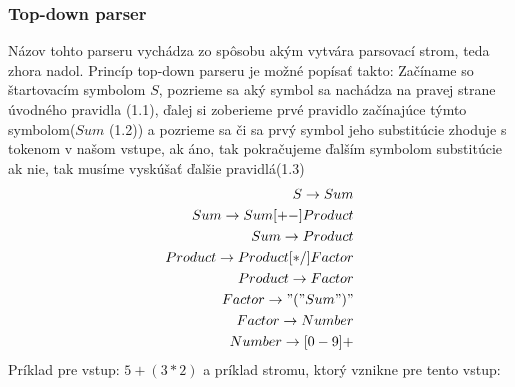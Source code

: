 \documentclass[12pt,a4paper]{report}
\theoremstyle{definition}
\theoremstyle{remark}
\begin{document}
\subsubsection*{Top-down parser} 
Názov tohto parseru vychádza zo spôsobu akým vytvára parsovací strom, teda zhora nadol.
Princíp top-down parseru je možné popísať takto: Začíname so štartovacím symbolom $S$, pozrieme sa aký symbol sa nachádza na pravej strane úvodného pravidla (1.1), ďalej si zoberieme prvé pravidlo začínajúce týmto symbolom($Sum$ (1.2)) a pozrieme sa či sa prvý symbol jeho substitúcie zhoduje s tokenom v našom vstupe, ak áno, tak pokračujeme ďalším symbolom substitúcie ak nie, tak musíme vyskúšať ďalšie pravidlá(1.3)
\begin{align}
S \to Sum \\
Sum \to Sum [+-] Product \\
Sum \to Product \\
Product \to Product [*/] Factor \\
Product \to Factor \\
Factor \to "(" Sum ")" \\
Factor \to Number \\
Number \to [0-9]+
\end{align}
\noindent 
Príklad pre vstup: $ 5 + (3 * 2)$ a príklad stromu, ktorý vznikne pre tento vstup: \\
\end{document}
